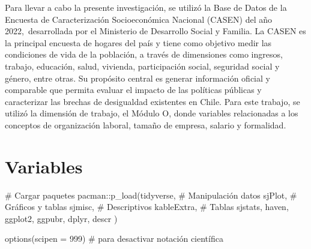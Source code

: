 \documentclass[
  a4paper,
  oneside]{scrbook}
\newenvironment{Shaded}{\begin{snugshade}}{\end{snugshade}}
\newcommand{\AttributeTok}[1]{\textcolor[rgb]{0.40,0.45,0.13}{#1}}
\newcommand{\CommentTok}[1]{\textcolor[rgb]{0.37,0.37,0.37}{#1}}
\newcommand{\DecValTok}[1]{\textcolor[rgb]{0.68,0.00,0.00}{#1}}
\newcommand{\FunctionTok}[1]{\textcolor[rgb]{0.28,0.35,0.67}{#1}}
\newcommand{\NormalTok}[1]{\textcolor[rgb]{0.00,0.23,0.31}{#1}}
\newcommand{\SpecialCharTok}[1]{\textcolor[rgb]{0.37,0.37,0.37}{#1}}
\begin{document}
Para llevar a cabo la presente investigación, se utilizó la Base de
Datos de la Encuesta de Caracterización Socioeconómica Nacional (CASEN)
del año 2022,~desarrollada por el Ministerio de Desarrollo Social y
Familia. La CASEN es la principal encuesta de hogares del país y tiene
como objetivo medir las condiciones de vida de la población, a través de
dimensiones como ingresos, trabajo, educación, salud, vivienda,
participación social, seguridad social y género, entre otras. Su
propósito central es generar información oficial y comparable que
permita evaluar el impacto de las políticas públicas y caracterizar las
brechas de desigualdad existentes en Chile. Para este trabajo, se
utilizó la dimensión de trabajo, el Módulo O, donde variables
relacionadas a los conceptos de organización laboral, tamaño de empresa,
salario y formalidad.

\section{Variables}\label{variables}

\begin{Shaded}
\begin{Highlighting}[]
\CommentTok{\# Cargar paquetes}
\NormalTok{pacman}\SpecialCharTok{::}\FunctionTok{p\_load}\NormalTok{(tidyverse, }\CommentTok{\# Manipulación datos}
\NormalTok{               sjPlot, }\CommentTok{\# Gráficos y tablas}
\NormalTok{               sjmisc, }\CommentTok{\# Descriptivos}
\NormalTok{               kableExtra, }\CommentTok{\# Tablas}
\NormalTok{               sjstats,}
\NormalTok{               haven,}
\NormalTok{               ggplot2,}
\NormalTok{               ggpubr,}
\NormalTok{               dplyr,}
\NormalTok{               descr}
\NormalTok{               )}

\FunctionTok{options}\NormalTok{(}\AttributeTok{scipen =} \DecValTok{999}\NormalTok{) }\CommentTok{\# para desactivar notación científica}
\end{Highlighting}
\end{Shaded}
\end{document}
